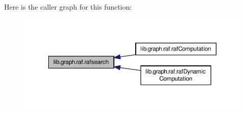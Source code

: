 Here is the caller graph for this function\-:\nopagebreak
\begin{figure}[H]
\begin{center}
\leavevmode
\includegraphics[width=350pt]{a00107_a532a434a0b2fe187a3ff5a8319e4e3b4_icgraph}
\end{center}
\end{figure}


